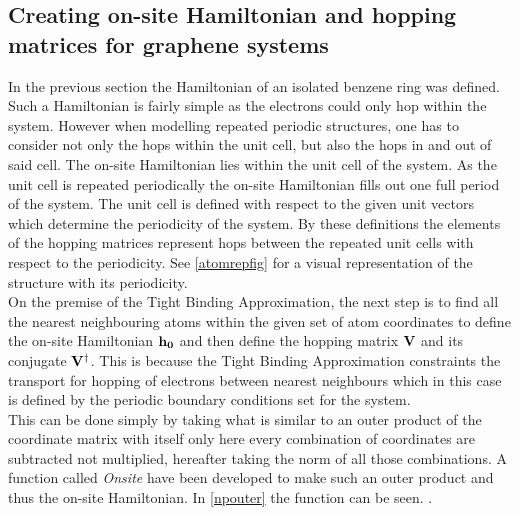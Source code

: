\subsection{Creating on-site Hamiltonian and hopping matrices for graphene systems}
In the previous section the Hamiltonian of an isolated benzene ring was defined. Such a Hamiltonian is fairly simple as the electrons could only hop within the system. However when modelling repeated periodic structures, one has to consider not only the hops within the unit cell, but also the hops in and out of said cell.
The on-site Hamiltonian lies within the unit cell of the system. As the unit cell is repeated periodically the on-site Hamiltonian fills out one full period of the system. The unit cell is defined with respect to the given unit vectors which determine the periodicity of the system. By these definitions the elements of the hopping matrices represent hops between the repeated unit cells with respect to the periodicity. See \cref{atomrepfig} for a visual representation of the structure with its periodicity. \\
On the premise of the Tight Binding Approximation, the next step is to find all the nearest neighbouring atoms within the given set of atom coordinates to define the on-site Hamiltonian \(\bf{h}_0\) and then define the hopping matrix \(\bf{V}\) and its conjugate \(\bf{V}^{\dagger}\). This is because the Tight Binding Approximation constraints the  transport for hopping of electrons between nearest neighbours which in this case is defined by the periodic boundary conditions set for the system.\\ This can be done simply by taking what is similar to an outer product of the coordinate matrix with itself only here every combination of coordinates are subtracted not multiplied, hereafter taking the norm of all those combinations. A function called \textit{Onsite} have been developed to make such an outer product and thus the on-site Hamiltonian. In \cref{npouter} the function can be seen.
. 
\vspace{-1\baselineskip}
\vspace{\baselineskip}
